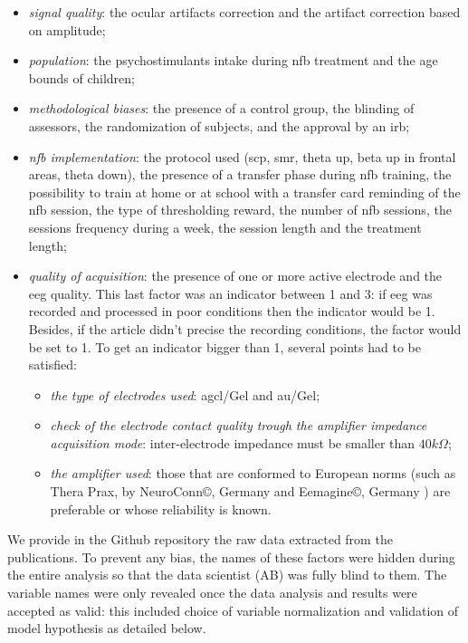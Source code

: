 \begin{itemize}
\item \emph{signal quality}: the ocular artifacts correction and the artifact correction based on amplitude; 
\item \emph{population}: the psychostimulants intake during \gls{nfb} treatment and the age bounds of children;
\item \emph{methodological biases}: the presence of a control group, the blinding of assessors, 
the randomization of subjects, and the approval by an \gls{irb};
\item \emph{\gls{nfb} implementation}: the protocol used (\gls{scp}, \gls{smr}, 
theta up, beta up in frontal areas, theta down), the presence of a transfer phase during \gls{nfb} training, the possibility to train at home 
or at school with a transfer card reminding of the \gls{nfb} session, 
the type of thresholding reward, the number of \gls{nfb} sessions, the sessions frequency during a week, the session length and the treatment length;
\item \emph{quality of acquisition}: the presence of one or more active electrode and the \gls{eeg} quality. 
This last factor was an indicator between 1 and 3: if \gls{eeg} was recorded and processed in poor conditions then the indicator would be 1. 
Besides, if the article didn't precise the recording conditions, the factor would be set to 1. To get an indicator bigger than 1, several 
points had to be satisfied:
\begin{itemize}
  \item \emph{the type of electrodes used}: \gls{agcl}/Gel and \gls{au}/Gel;
  \item \emph{check of the electrode contact quality trough the amplifier impedance acquisition mode}: inter-electrode impedance must be smaller than $40k\Omega$;  
  \item \emph{the amplifier used}: those that are conformed to European norms (such as Thera Prax\textregistered, by NeuroConn\copyright,
	Germany \citep{NeuroCare} and Eemagine\copyright, Germany \citep{Eemagine}) are preferable or whose reliability is known.
\end{itemize}
\end{itemize}

We provide in the Github repository \citep{Bussalb2018} the raw data extracted from the publications. To prevent any bias, the names of these factors
were hidden during the entire analysis so that the data scientist (AB) was fully blind to them. The variable names were only revealed once the data 
analysis and results were accepted as valid: this included choice of variable normalization and validation of model hypothesis as detailed below.

